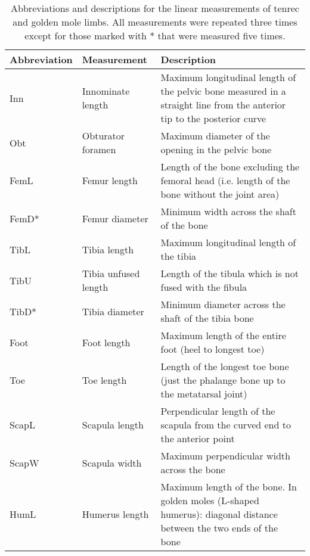 \begin{center}
\begin{longtable} {p{} p{} p{}}
\caption[Limb measurements] {Abbreviations and descriptions for the linear measurements of tenrec and golden mole limbs. All measurements were repeated three times except for those marked with * that were measured five times.} \\

\hline
\textbf{Abbreviation} & \textbf{Measurement} & \textbf{Description}\\
\hline
Inn & Innominate length & Maximum longitudinal length of the pelvic bone measured in a straight line from the anterior tip to the posterior curve\\ 
Obt & Obturator foramen & Maximum diameter of the opening in the pelvic bone\\
FemL & Femur length & Length of the bone excluding the femoral head (i.e. length of the bone without the joint area)\\
FemD* & Femur diameter & Minimum width across the shaft of the bone\\
TibL & Tibia length & Maximum longitudinal length of the tibia\\
TibU & Tibia unfused length & Length of the tibula which is not fused with the fibula\\
TibD* & Tibia diameter & Minimum diameter across the shaft of the tibia bone\\
Foot & Foot length & Maximum length of the entire foot (heel to longest toe)\\
Toe & Toe length & Length of the longest toe bone (just the phalange bone up to the metatarsal joint)\\
ScapL & Scapula length & Perpendicular length of the scapula from the curved end to the anterior point\\
ScapW & Scapula width & Maximum perpendicular width across the bone\\
HumL & Humerus length & Maximum length of the bone. In golden moles (L-shaped humerus): diagonal distance between the two ends of the bone\\

\end{longtable}
\end{center}
